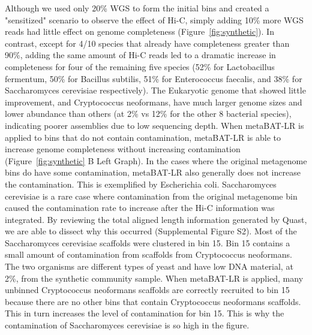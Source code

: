 \documentclass[fleqn,10pt,lineno]{wlpeerj}
\begin{document}
Although we used only 20\% WGS to form the initial bins and created a "sensitized" scenario to observe the effect of Hi-C, simply adding 10\% more WGS reads had little effect on genome completeness (Figure~\ref{fig:synthetic}). In contrast, except for 4/10 species that already have completeness greater than 90\%, adding the same amount of Hi-C reads led to a dramatic increase in completeness for four of the remaining five species (52\% for Lactobacillus fermentum, 50\% for Bacillus subtilis, 51\% for Enterococcus faecalis, and 38\% for Saccharomyces cerevisiae respectively). The Eukaryotic genome that showed little improvement,  and Cryptococcus neoformans, have much larger genome sizes and lower abundance than others (at 2\% vs 12\% for the other 8 bacterial species), indicating poorer assemblies due to low sequencing depth. When metaBAT-LR is applied to bins that do not contain contamination, metaBAT-LR is able to increase genome completeness without increasing contamination (Figure~\ref{fig:synthetic} B Left Graph). In the cases where the original metagenome bins do have some contamination, metaBAT-LR also generally does not increase the contamination. This is exemplified by Escherichia coli. Saccharomyces cerevisiae is a rare case where contamination from the original metagenome bin caused the contamination rate to increase after the Hi-C information was integrated. By reviewing the total aligned length information generated by Quast, we are able to dissect why this occurred (Supplemental Figure S2). Most of the Saccharomyces cerevisiae scaffolds were clustered in bin 15. Bin 15 contains a small amount of contamination from scaffolds from Cryptococcus neoformans. The two organisms are different types of yeast and have low DNA material, at 2\%, from the synthetic community sample. When metaBAT-LR is applied, many unbinned Cryptococcus neoformans scaffolds are correctly recruited to bin 15 because there are no other bins that contain Cryptococcus neoformans scaffolds. This in turn increases the level of contamination for bin 15. This is why the contamination of Saccharomyces cerevisiae is so high in the figure.                   


\end{document}
